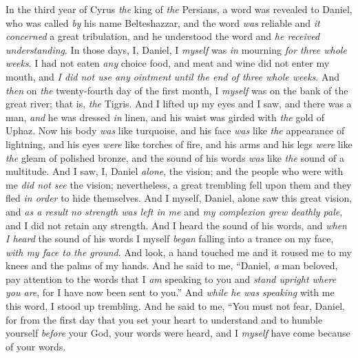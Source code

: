 \begin{biblechapter} %
 In the third year of Cyrus \textit{the} king of \textit{the} Persians, a word was revealed to Daniel, who was called \textit{by} his name Belteshazzar, and the word \textit{was} reliable and \textit{it concerned} a great tribulation, and he understood the word and \textit{he received understanding}.
\verse In those days, I, Daniel, I \textit{myself} was \textit{in} mourning \textit{for three whole weeks}.
\verse I had not eaten \textit{any} choice food, and meat and wine did not enter my mouth, and \textit{I did not use any ointment} \textit{until the end of three whole weeks}.
\verse And \textit{then} on \textit{the} twenty-fourth day of the first month, I \textit{myself} was on the bank of the great river; that is, \textit{the} Tigris.
\verse And I lifted up my eyes and I saw, and there was a man, \textit{and} he was dressed \textit{in} linen, and his waist was girded with \textit{the} gold of Uphaz.
\verse Now his body \textit{was} like turquoise, and his face \textit{was} like \textit{the} appearance of lightning, and his eyes \textit{were} like torches of fire, and his arms and his legs \textit{were} like \textit{the} gleam of polished bronze, and the sound of his words \textit{was} like \textit{the} sound of a multitude.
\verse And I saw, I, Daniel \textit{alone}, the vision; and the people who were with me \textit{did not see} the vision; nevertheless, a great trembling fell upon them and they fled \textit{in order} to hide themselves.
\verse And I myself, Daniel, alone saw this great vision, and \textit{as a result} \textit{no strength was left in me} and \textit{my complexion grew deathly pale}, and I did not retain any strength.
\verse And I heard the sound of his words, and \textit{when I heard} the sound of his words I myself \textit{began} falling into a trance on my face, \textit{with my face to the ground}.
\verse And look, a hand touched me and it roused me to my knees and the palms of my hands.
\verse And he said to me, “Daniel, \textit{a} man beloved, pay attention to the words that I \textit{am} speaking to you and \textit{stand upright where you are}, for I have now been sent to you.” And \textit{while he was speaking} with me this word, I stood up trembling.
\verse And he said to me, “You must not fear, Daniel, for from the first day that you set your heart to understand and to humble yourself \textit{before} your God, your words were heard, and I \textit{myself} have come because of your words.

\end{biblechapter}
